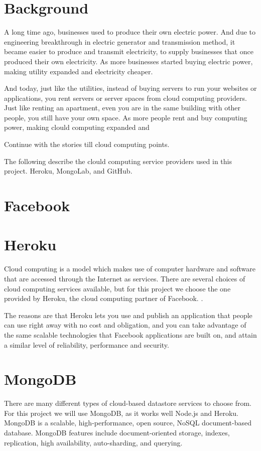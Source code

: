 
\section{Background}

A long time ago, businesses used to produce their own electric power. And due to engineering breakthrough in electric generator and transmission method, it became easier to produce and transmit electricity, to supply businesses that once produced their own electricity. As more businesses started buying electric power, making utility expanded and electricity cheaper. 

And today, just like the utilities, instead of buying servers to run your websites or applications, you rent servers or server spaces from cloud computing providers. Just like renting an apartment, even you are in the same building with other people, you still have your own space. As more people rent and buy computing power, making clould computing expanded and    

Continue with the stories till cloud computing points.


The following describe the clould computing service providers used in this project. Heroku, MongoLab, and GitHub.

\section{Facebook}

\section{Heroku}
Cloud computing is a model which makes use of computer hardware and software that are accessed through the Internet as services. There are several choices of cloud computing services available, but for this project we choose the one provided by Heroku, the cloud computing partner of Facebook. \cite{Heroku}.

The reasons are that Heroku lets you use and publish an application that people can use right away with no cost and obligation, and you can take advantage of the same scalable technologies that Facebook applications are built on, and attain a similar level of reliability, performance and security. 

\section{MongoDB}
There are many different types of cloud-based datastore services to choose from. For this project we will use MongoDB, as it works well Node.js and Heroku. MongoDB is a scalable, high-performance, open source, NoSQL document-based database. MongoDB features include document-oriented storage, indexes, replication, high availability, auto-sharding, and querying.


